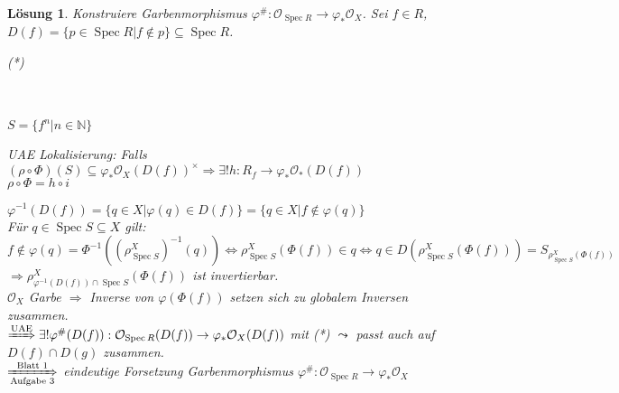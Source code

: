 \documentclass[paper = A4, fontsize=12pt, numbers=noendperiod, chapterprefix=true]{scrbook}
\theoremstyle{break}
\newtheorem{Loes}{L\"osung}
\theoremstyle{nonumberbreak}
\theoremstyle{nonumberplain}
\newcommand{\quot}[1]{\textrm{\glqq}{#1}\textrm{\grqq}}
\newcommand{\schraffiert}{\ensuremath{\nicefrac{\nicefrac{}{}}{\nicefrac{}{}}}}
\DeclareMathOperator{\Spec}{Spec}
\newcommand{\N}{\mathbb{N}}
\newcommand{\calO}{\mathcal{O}}
\begin{document}
\begin{Loes}
Konstruiere Garbenmorphismus $\varphi^\#: \calO_{\Spec R} \to \varphi_*\calO_X$. Sei $f\in R$, $D(f) = \{p \in \Spec R | f\notin p\} \subseteq \Spec R$.
\begin{center}(*)
\\ \ \\$S=\{f^n|n\in \N\}$\end{center}
\emph{UAE Lokalisierung:} Falls $(\rho \circ \Phi)(S) \subseteq \varphi_*\calO_X(D(f))^\times \Rightarrow \exists! h : R_f \to \varphi_*\calO_*(D(f))$\\
$\rho \circ \Phi = h \circ i$

$\varphi^{-1}(D(f)) = \{q \in X | \varphi(q) \in D(f)\} = \{q \in X | f \notin \varphi(q)\}$\\
F\"ur $q \in \Spec S \subseteq X$ gilt:
	\[f \notin \varphi(q) = \Phi^{-1}((\rho_{\Spec S}^X)^{-1}(q)) \Leftrightarrow \rho_{\Spec S}^X (\Phi(f)) \in q \Leftrightarrow q \in D(\rho_{\Spec S}^X(\Phi(f))) = S_{\rho_{\Spec S}^X (\Phi (f))} \]
$\Rightarrow \rho_{\varphi^{-1}(D(f)) \cap \Spec S}^X (\Phi(f))$ ist invertierbar.\\
$\calO_X$ Garbe $\Rightarrow $ Inverse von $\varphi(\Phi(f))$ setzen sich zu \quot{globalem} Inversen zusammen.\\
$\xRightarrow{\text{UAE}} \exists! \varphi^\#(D(f)) : \calO_{\Spec R}(D(f)) \to \varphi_*\calO_X(D(f))$ mit (*) $\leadsto$ passt auch auf $D(f) \cap D(g)$ zusammen.\\
$\xRightarrow[\text{Aufgabe 3}]{\text{Blatt 1}}$ eindeutige Forsetzung Garbenmorphismus $\varphi^\#: \calO_{\Spec R} \to \varphi_*\calO_X$


\end{Loes}
\end{document}

